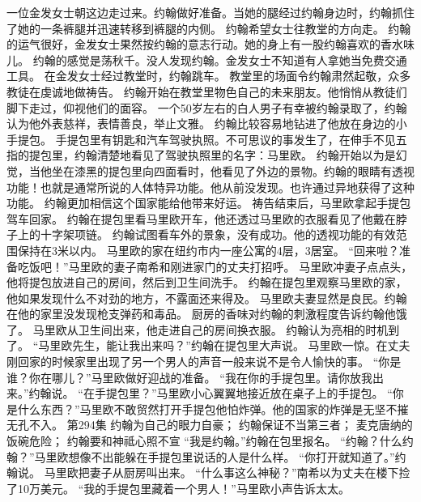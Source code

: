 \documentclass[a4paper,12pt,UTF8,twoside]{ctexbook}
\begin{document}
        一位金发女士朝这边走过来。约翰做好准备。当她的腿经过约翰身边时，约翰抓住了她的一条裤腿并迅速转移到裤腿的内侧。  
        约翰希望女士往教堂的方向走。  
        约翰的运气很好，金发女士果然按约翰的意志行动。她的身上有一股约翰喜欢的香水味儿。  
        约翰的感觉是荡秋千。没人发现约翰。金发女士不知道有人拿她当免费交通工具。  
        在金发女士经过教堂时，约翰跳车。  
        教堂里的场面令约翰肃然起敬，众多教徒在虔诚地做祷告。  
        约翰开始在教堂里物色自己的未来朋友。他悄悄从教徒们脚下走过，仰视他们的面容。  
        一个50岁左右的白人男子有幸被约翰录取了，约翰认为他外表慈祥，表情善良，举止文雅。  
        约翰比较容易地钻进了他放在身边的小手提包。  
        手提包里有钥匙和汽车驾驶执照。不可思议的事发生了，在伸手不见五指的提包里，约翰清楚地看见了驾驶执照里的名字：马里欧。  
        约翰开始以为是幻觉，当他坐在漆黑的提包里向四面看时，他看见了外边的景物。约翰的眼睛有透视功能！也就是通常所说的人体特异功能。他从前没发现。也许通过异地获得了这种功能。  
        约翰更加相信这个国家能给他带来好运。  
        祷告结束后，马里欧拿起手提包驾车回家。  
        约翰在提包里看马里欧开车，他还透过马里欧的衣服看见了他戴在脖子上的十字架项链。  
        约翰试图看车外的景象，没有成功。他的透视功能的有效范围保持在3米以内。  
        马里欧的家在纽约市内一座公寓的4层，3居室。  
        “回来啦？准备吃饭吧！”马里欧的妻子南希和刚进家门的丈夫打招呼。  
        马里欧冲妻子点点头，他将提包放进自己的房间，然后到卫生间洗手。  
        约翰在提包里观察马里欧的家，他如果发现什么不对劲的地方，不露面还来得及。  
        马里欧夫妻显然是良民。约翰在他的家里没发现枪支弹药和毒品。  
        厨房的香味对约翰的刺激程度告诉约翰他饿了。  
        马里欧从卫生间出来，他走进自己的房间换衣服。  
        约翰认为亮相的时机到了。  
        “马里欧先生，能让我出来吗？”约翰在提包里大声说。  
        马里欧一惊。在丈夫刚回家的时候家里出现了另一个男人的声音一般来说不是令人愉快的事。  
        “你是谁？你在哪儿？”马里欧做好迎战的准备。  
        “我在你的手提包里。请你放我出来。”约翰说。  
        “在手提包里？”马里欧小心翼翼地接近放在桌子上的手提包。  
        “你是什么东西？”马里欧不敢贸然打开手提包他怕炸弹。他的国家的炸弹是无坚不摧无孔不入。          第294集  
        约翰为自己的眼力自豪；  
        约翰保证不当第三者；  
        麦克唐纳的饭碗危险；  
        约翰要和神祗心照不宣    
        “我是约翰。”约翰在包里报名。  
        “约翰？什么约翰？”马里欧想像不出能躲在手提包里说话的人是什么样。  
        “你打开就知道了。”约翰说。  
        马里欧把妻子从厨房叫出来。  
        “什么事这么神秘？”南希以为丈夫在楼下捡了10万美元。  
        “我的手提包里藏着一个男人！”马里欧小声告诉太太。  
\end{document}
